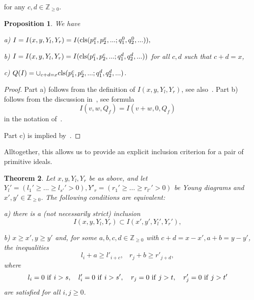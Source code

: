 \documentclass[10pt]{amsart}\oddsidemargin -1mm \evensidemargin -1mm \topmargin -15mm\headheight5mm \headsep 3.5mm \textheight 245mm\textwidth 170mm %
\newtheorem{theorem}{Theorem}[section]\newtheorem{lemma}[theorem]{Lemma}\newtheorem{claim}[theorem]{Claim}\newtheorem{remark}[theorem]{Remark}\newtheorem{proposition}[theorem]{Proposition}\newtheorem{corollary}[theorem]{Corollary}\newtheorem{definition}[theorem]{Definition}\newtheorem{Ex}[theorem]{Example}\newtheorem*{Ex0}{Examples}
\begin{document}
for any $c, d\in\mathbb Z_{\ge0}$.
\begin{proposition}\label{Pordz}We have

a) $I=I(x, y, Y_l, Y_r)=I({\rm cls}(p_1^x, p_2^x,...; q_1^0, q_2^0,...)),$

b) $I=I(x, y, Y_l, Y_r)=I({\rm cls}(p_1^c, p_2^c,...; q_1^d, q_2^d,...))$ for all $c, d$ such that $c+d=x$,

c) $Q(I)=\cup_{c+d=x} {\rm cls}(p_1^c, p_2^c,...; q_1^d, q_2^d,...)$.
\end{proposition}
\begin{proof}Part a) follows from the definition of $I(x, y, Y_l, Y_r)$, see also~\cite[Theorem~7.9]{PP1}. Part b) follows from the discussion in~\cite[Subsection~7.4]{PP1}, see formula
$$I(v, w, Q_f)=I(v+w, 0, Q_f)$$
in the notation of~\cite{PP1}.

Part c) is implied by~\cite[Lemma 7.6c)]{PP1}.\end{proof}
Alltogether, this allows us to provide an explicit inclusion criterion for a pair of primitive ideals.
\begin{theorem}\label{Tord} Let $x, y, Y_l, Y_r$ be as above, and let $Y_l'=(l_1'\ge...\ge l_{s'}'>0), Y'_r=(r_1'\ge...\ge r_{t'}'>0)$ be Young diagrams and $x', y'\in\mathbb Z_{\ge0}$. 
The following conditions are equivalent:

a) there is a (not necessarily strict) inclusion
\begin{equation}I(x, y, Y_l, Y_r)\subset I(x', y',  Y_l', Y_r'),\label{Eid17}\end{equation}

b) $x\ge x', y\ge y'$ and, for some $a, b, c, d\in\mathbb Z_{\ge0}$ with $c+d=x-x', a+b=y-y'$, the inequalities
$$ l_{i}+a\ge l'_{i+c},\hspace{10pt}r_{j}+b\ge r'_{j+d},$$
where
$$l_i=0{\rm~if~}i>s,\hspace{10pt}l'_i=0{\rm~if~}i>s',\hspace{10pt}r_j=0{\rm~if~}j>t,\hspace{10pt}r'_j=0{\rm~if~}j>t'$$
are satisfied for all $i, j\ge 0$.
\end{theorem}
\end{document}
